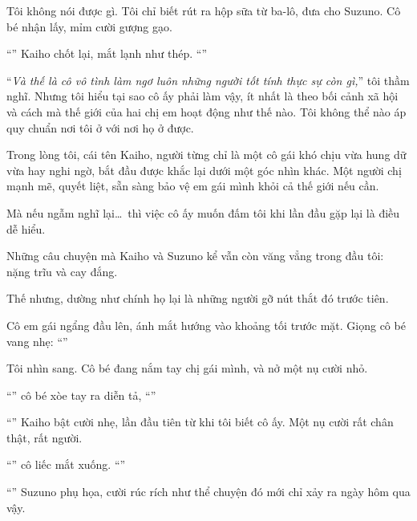 \documentclass[../main.tex]{subfiles}
\begin{document}
Tôi không nói được gì. Tôi chỉ biết rút ra hộp sữa từ ba-lô, đưa cho Suzuno. Cô bé nhận lấy, mỉm cười gượng gạo.

``'' Kaiho chốt lại, mắt lạnh như thép. ``''

``\textit{Và thế là cô vô tình làm ngơ luôn những người tốt tính thực sự còn gì,}'' tôi thầm nghĩ. Nhưng tôi hiểu tại sao cô ấy phải làm vậy, ít nhất là theo bối cảnh xã hội và cách mà thế giới của hai chị em hoạt động như thế nào. Tôi không thể nào áp quy chuẩn nơi tôi ở với nơi họ ở được.

Trong lòng tôi, cái tên Kaiho, người từng chỉ là một cô gái khó chịu vừa hung dữ vừa hay nghi ngờ, bắt đầu được khắc lại dưới một góc nhìn khác. Một người chị mạnh mẽ, quyết liệt, sẵn sàng bảo vệ em gái mình khỏi cả thế giới nếu cần.

Mà nếu ngẫm nghĩ lại\dots\ thì việc cô ấy muốn đấm tôi khi lần đầu gặp lại là điều dễ hiểu.

Những câu chuyện mà Kaiho và Suzuno kể vẫn còn văng vẳng trong đầu tôi: nặng trĩu và cay đắng.

Thế nhưng, dường như chính họ lại là những người gỡ nút thắt đó trước tiên.

Cô em gái ngẩng đầu lên, ánh mắt hướng vào khoảng tối trước mặt. Giọng cô bé vang nhẹ: ``''

Tôi nhìn sang. Cô bé đang nắm tay chị gái mình, và nở một nụ cười nhỏ.

``'' cô bé xòe tay ra diễn tả, ``''

``'' Kaiho bật cười nhẹ, lần đầu tiên từ khi tôi biết cô ấy. Một nụ cười rất chân thật, rất người.

``'' cô liếc mắt xuống. ``''

``'' Suzuno phụ họa, cười rúc rích như thể chuyện đó mới chỉ xảy ra ngày hôm qua vậy.
\end{document}
